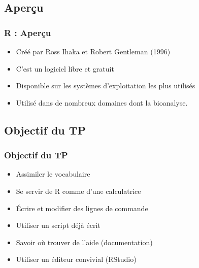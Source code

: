 \documentclass[handout, table,svgnames,hyperref={pdfpagemode=FullScreen}]{beamer}
\begin{document}
\subsection{Aperçu}

\begin{frame}
	\frametitle{R : Aperçu}
	\begin{center}
		\begin{block}{}
			\begin{itemize}
				\item Créé par Ross Ihaka et Robert Gentleman (1996)
				\item C'est un logiciel libre et gratuit
				\item Disponible sur les systèmes d'exploitation les plus utilisés
				\item Utilisé dans de nombreux domaines dont la bioanalyse.
			\end{itemize}
		\end{block}
	\end{center}
\end{frame}

\subsection{Objectif du TP}
\begin{frame}
	\frametitle{Objectif du TP}
		
	\begin{itemize}[<+->]
		\item {Assimiler le vocabulaire }
		\item {Se servir de R comme d'une calculatrice}
		\item {Écrire et modifier des lignes de commande}
		\item {Utiliser un script déjà écrit}
		\item {Savoir où trouver de l'aide (documentation)}
		\item {Utiliser un éditeur convivial (RStudio)}%
	\end{itemize}
\end{frame}
\end{document}
